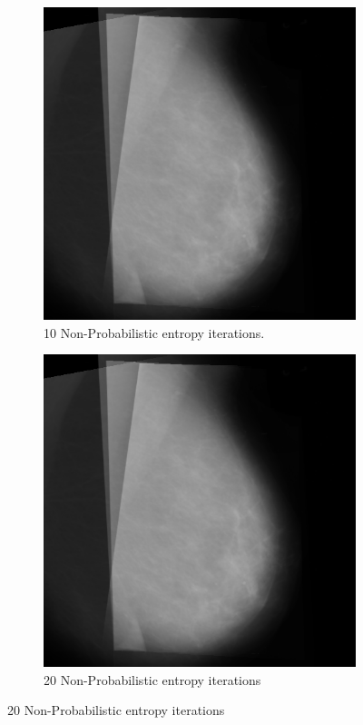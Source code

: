 \begin{figure}[H]
\begin{subfigure}[t]{0.3\textwidth}
      \includegraphics[width=\textwidth]{Chapter3/nonProb-img/nonProb10.png}
        \caption{10 Non-Probabilistic entropy iterations.}
        \label{fig:10-nonProb}
    \end{subfigure} \hfill
    \begin{subfigure}[t]{0.3\textwidth}
      \includegraphics[width=\textwidth]{Chapter3/nonProb-img/nonProb20.png}
      \caption{20 Non-Probabilistic entropy iterations}
      \label{fig:20-nonProb}
    \end{subfigure}
\end{figure}

